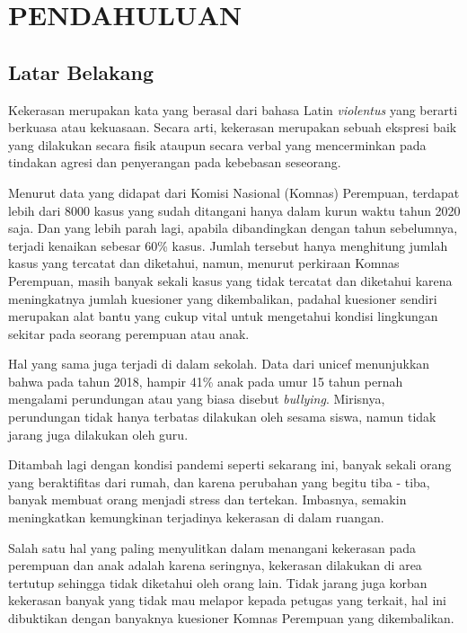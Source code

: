 \chapter{PENDAHULUAN}


\section{Latar Belakang}

Kekerasan merupakan kata yang berasal dari bahasa Latin \textit{violentus} yang berarti berkuasa atau kekuasaan. Secara arti, kekerasan merupakan sebuah ekspresi baik yang dilakukan secara fisik ataupun secara verbal yang mencerminkan pada tindakan agresi dan penyerangan pada kebebasan seseorang.

Menurut data yang didapat dari Komisi Nasional (Komnas) Perempuan, terdapat lebih dari 8000 kasus yang sudah ditangani hanya dalam kurun waktu tahun 2020 saja. Dan yang lebih parah lagi, apabila dibandingkan dengan tahun sebelumnya, terjadi kenaikan sebesar 60\%  kasus. Jumlah tersebut hanya menghitung jumlah kasus yang tercatat dan diketahui, namun, menurut perkiraan Komnas Perempuan, masih banyak sekali kasus yang tidak tercatat dan diketahui karena meningkatnya jumlah kuesioner yang dikembalikan, padahal kuesioner sendiri merupakan alat bantu yang cukup vital untuk mengetahui kondisi lingkungan sekitar pada seorang perempuan atau anak.

Hal yang sama juga terjadi di dalam sekolah. Data dari unicef menunjukkan bahwa pada tahun 2018, hampir 41\% anak pada umur 15 tahun pernah mengalami perundungan atau yang biasa disebut \textit{bullying}. Mirisnya, perundungan tidak hanya terbatas dilakukan oleh sesama siswa, namun tidak jarang juga dilakukan oleh guru.

Ditambah lagi dengan kondisi pandemi seperti sekarang ini, banyak sekali orang yang beraktifitas dari rumah, dan karena perubahan yang begitu tiba - tiba, banyak membuat orang menjadi stress dan tertekan. Imbasnya, semakin meningkatkan kemungkinan terjadinya kekerasan di dalam ruangan.

Salah satu hal yang paling menyulitkan dalam menangani kekerasan pada perempuan dan anak adalah karena seringnya, kekerasan dilakukan di area tertutup sehingga tidak diketahui oleh orang lain. Tidak jarang juga korban kekerasan banyak yang tidak mau melapor kepada petugas yang terkait, hal ini dibuktikan dengan banyaknya kuesioner Komnas Perempuan yang dikembalikan.

